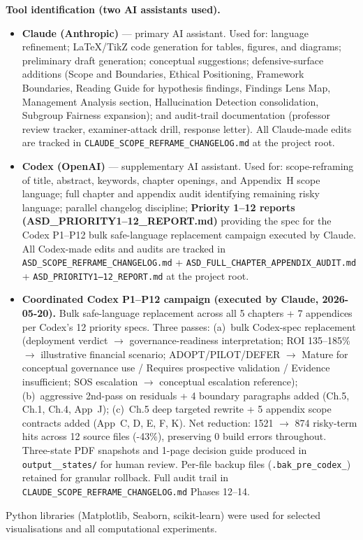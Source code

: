 \vspace{0.5em}
\noindent\textbf{Tool identification (two AI assistants used).}
\begin{itemize}[leftmargin=*, itemsep=2pt]
    \item \textbf{Claude (Anthropic)} --- primary AI assistant. Used for: language refinement; LaTeX/TikZ code generation for tables, figures, and diagrams; preliminary draft generation; conceptual suggestions; defensive-surface additions (Scope and Boundaries, Ethical Positioning, Framework Boundaries, Reading Guide for hypothesis findings, Findings Lens Map, Management Analysis section, Hallucination Detection consolidation, Subgroup Fairness expansion); and audit-trail documentation (professor review tracker, examiner-attack drill, response letter). All Claude-made edits are tracked in \texttt{CLAUDE\_\allowbreak SCOPE\_\allowbreak REFRAME\_\allowbreak CHANGELOG.md} at the project root.
    \item \textbf{Codex (OpenAI)} --- supplementary AI assistant. Used for: scope-reframing of title, abstract, keywords, chapter openings, and Appendix~H scope language; full chapter and appendix audit identifying remaining risky language; parallel changelog discipline; \textbf{Priority 1--12 reports (ASD\_PRIORITY1--12\_REPORT.md)} providing the spec for the Codex P1--P12 bulk safe-language replacement campaign executed by Claude. All Codex-made edits and audits are tracked in \texttt{ASD\_\allowbreak SCOPE\_\allowbreak REFRAME\_\allowbreak CHANGELOG.md} + \texttt{ASD\_\allowbreak FULL\_\allowbreak CHAPTER\_\allowbreak APPENDIX\_\allowbreak AUDIT.md} + \texttt{ASD\_\allowbreak PRIORITY1--12\_\allowbreak REPORT.md} at the project root.
    \item \textbf{Coordinated Codex P1--P12 campaign (executed by Claude, 2026-05-20).} Bulk safe-language replacement across all 5 chapters + 7 appendices per Codex's 12 priority specs. Three passes: (a)~bulk Codex-spec replacement (deployment verdict $\to$ governance-readiness interpretation; ROI 135--185\% $\to$ illustrative financial scenario; ADOPT/PILOT/DEFER $\to$ Mature for conceptual governance use / Requires prospective validation / Evidence insufficient; SOS escalation $\to$ conceptual escalation reference); (b)~aggressive 2nd-pass on residuals + 4 boundary paragraphs added (Ch.5, Ch.1, Ch.4, App~J); (c)~Ch.5 deep targeted rewrite + 5 appendix scope contracts added (App~C, D, E, F, K). Net reduction: 1521 $\to$ 874 risky-term hits across 12 source files (-43\%), preserving 0 build errors throughout. Three-state PDF snapshots and 1-page decision guide produced in \texttt{output\_\_\allowbreak states/} for human review. Per-file backup files (\texttt{.bak\_\allowbreak pre\_\allowbreak codex\_\allowbreak *}) retained for granular rollback. Full audit trail in \texttt{CLAUDE\_\allowbreak SCOPE\_\allowbreak REFRAME\_\allowbreak CHANGELOG.md} Phases 12--14.
\end{itemize}
Python libraries (Matplotlib, Seaborn, scikit-learn) were used for selected visualisations and all computational experiments.

